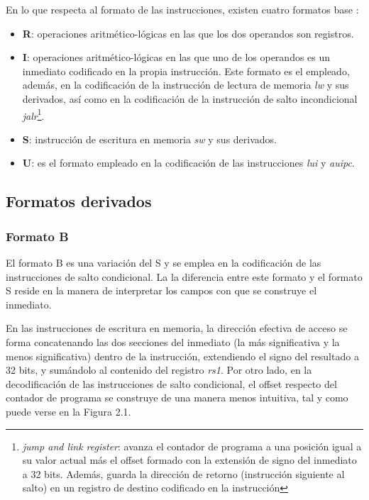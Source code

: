 En lo que respecta al formato de las instrucciones, existen cuatro formatos base \cite{riscv-unpriv-isa-20250508-unpriv-isa-base-instr-formats}:

\begin{itemize}
  \item \textbf{R}: operaciones aritmético-lógicas en las que los dos operandos son registros.
  \vspace{-0.2cm}
  \item \textbf{I}: operaciones aritmético-lógicas en las que uno de los operandos es un inmediato codificado en la propia instrucción. Este formato es el empleado, además, en la codificación de la instrucción de lectura de memoria \textit{lw} y sus derivados, así como en la codificación de la instrucción de salto incondicional \textit{jalr}\footnote{\textit{jump and link register}: avanza el contador de programa a una posición igual a su valor actual más el offset formado con la extensión de signo del inmediato a 32 bits. Además, guarda la dirección de retorno (instrucción siguiente al salto) en un registro de destino codificado en la instrucción}.
  \vspace{-0.2cm}
  \item \textbf{S}: instrucción de escritura en memoria \textit{sw} y sus derivados.
  \vspace{-0.2cm}
  \item \textbf{U}: es el formato empleado en la codificación de las instrucciones \textit{lui} y \textit{auipc}.
\end{itemize}

\subsection{Formatos derivados}

\subsubsection{Formato B}

El formato B es una variación del S y se emplea en la codificación de las instrucciones de salto condicional. La la diferencia entre este formato y el formato S reside en la manera de interpretar los campos con que se construye el inmediato.

En las instrucciones de escritura en memoria, la dirección efectiva de acceso se forma concatenando las dos secciones del inmediato (la más significativa y la menos significativa) dentro de la instrucción, extendiendo el signo del resultado a 32 bits, y sumándolo al contenido del registro \textit{rs1}. Por otro lado, en la decodificación de las instrucciones de salto condicional, el offset respecto del contador de programa se construye de una manera menos intuitiva, tal y como puede verse en la Figura 2.1.

